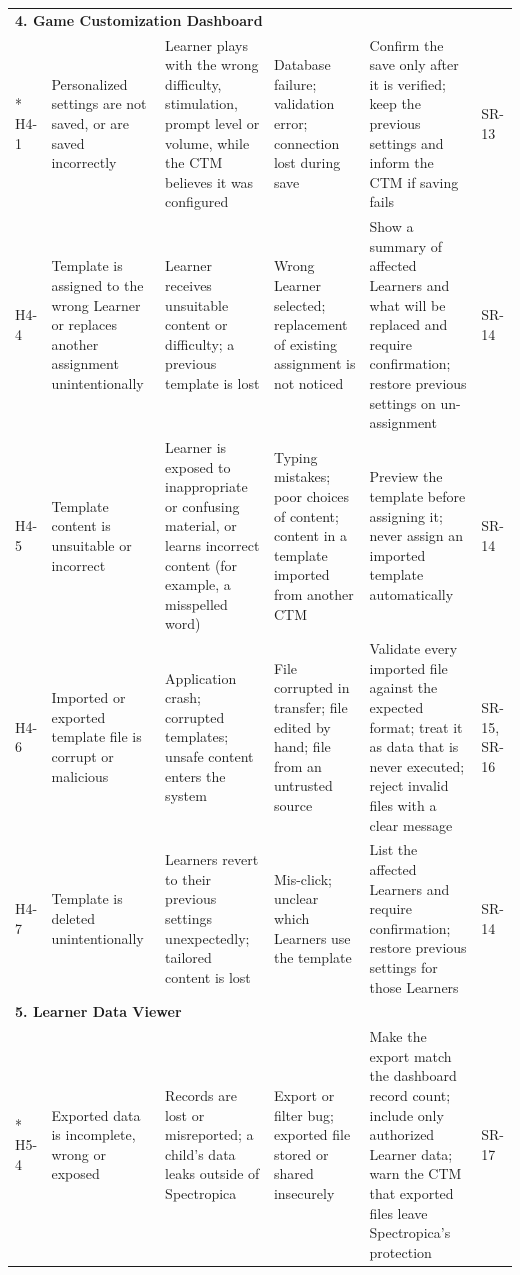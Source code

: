 \documentclass{article}
\begin{document}
\begin{landscape}
\begin{longtable}{p{1.0cm} p{3.1cm} p{3.9cm} p{3.9cm} p{5.2cm} p{2.5cm}}
\multicolumn{6}{l}{\textbf{4. Game Customization Dashboard}}\\*
\midrule
H4-1 & Personalized settings are not saved, or are saved incorrectly &
Learner plays with the wrong difficulty, stimulation, prompt level or volume, while the CTM believes it was configured &
Database failure; validation error; connection lost during save &
Confirm the save only after it is verified; keep the previous settings and inform the CTM if saving fails &
SR-13\\
\midrule
H4-4 & Template is assigned to the wrong Learner or replaces another assignment unintentionally &
Learner receives unsuitable content or difficulty; a previous template is lost &
Wrong Learner selected; replacement of existing assignment is not noticed &
Show a summary of affected Learners and what will be replaced and require confirmation; restore previous settings on un-assignment &
SR-14\\
\midrule
H4-5 & Template content is unsuitable or incorrect &
Learner is exposed to inappropriate or confusing material, or learns incorrect content (for example, a misspelled word) &
Typing mistakes; poor choices of content; content in a template imported from another CTM &
Preview the template before assigning it; never assign an imported template automatically &
SR-14\\
\midrule
H4-6 & Imported or exported template file is corrupt or malicious &
Application crash; corrupted templates; unsafe content enters the system &
File corrupted in transfer; file edited by hand; file from an untrusted source &
Validate every imported file against the expected format; treat it as data that is never executed; reject invalid files with a clear message &
SR-15, SR-16\\
\midrule
H4-7 & Template is deleted unintentionally &
Learners revert to their previous settings unexpectedly; tailored content is lost &
Mis-click; unclear which Learners use the template &
List the affected Learners and require confirmation; restore previous settings for those Learners &
SR-14\\
\midrule

\multicolumn{6}{l}{\textbf{5. Learner Data Viewer}}\\*
\midrule
H5-4 & Exported data is incomplete, wrong or exposed &
Records are lost or misreported; a child's data leaks outside of Spectropica &
Export or filter bug; exported file stored or shared insecurely &
Make the export match the dashboard record count; include only authorized Learner data; warn the CTM that exported files leave Spectropica's protection &
SR-17\\
\midrule


\end{longtable}
\end{landscape}
\end{document}
